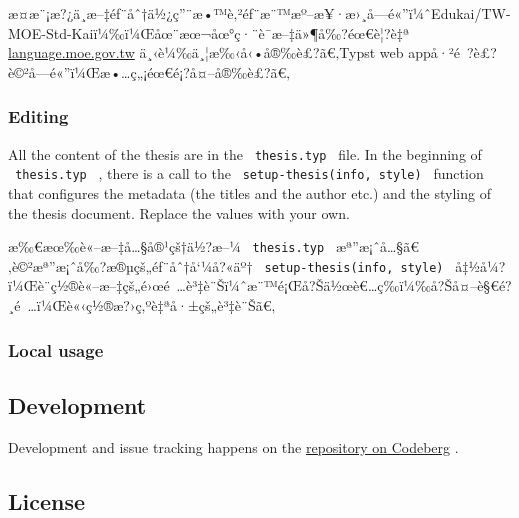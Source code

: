 æ­¤æ¨¡æ?¿ä¸­æ--‡éƒ¨åˆ†ä½¿ç''¨æ•™è‚²éƒ¨æ¨™æº--æ¥·æ›¸å­---é«''ï¼ˆEdukai/TW-MOE-Std-Kaiï¼‰ï¼Œåœ¨æœ¬åœ°ç·¨è­¯æ--‡ä»¶å‰?éœ€è¦?è‡ª
\href{https://language.moe.gov.tw/001/Upload/Files/site_content/M0001/edukai-5.0.zip}{language.moe.gov.tw}
ä¸‹è¼‰ä¸¦æ‰‹å‹•å®‰è£?ã€‚Typst web
appå·²é~?è£?è©²å­---é«''ï¼Œæ•\ldots ç„¡éœ€é¡?å¤--å®‰è£?ã€‚

\subsubsection{Editing}\label{editing}

All the content of the thesis are in the \texttt{\ thesis.typ\ } file.
In the beginning of \texttt{\ thesis.typ\ } , there is a call to the
\texttt{\ setup-thesis(info,\ style)\ } function that configures the
metadata (the titles and the author etc.) and the styling of the thesis
document. Replace the values with your own.

æ‰€æœ‰è«--æ--‡å\ldots§å®¹çš†ä½?æ--¼ \texttt{\ thesis.typ\ }
æª''æ¡ˆå\ldots§ã€‚è©²æª''æ¡ˆå‰?æ®µçš„éƒ¨åˆ†å`¼å?«äº†
\texttt{\ setup-thesis(info,\ style)\ }
å‡½å¼?ï¼Œè¨­ç½®è«--æ--‡çš„é›œé~\ldots è³‡è¨Šï¼ˆæ¨™é¡Œå?Šä½œè€\ldots ç­‰ï¼‰å?Šå¤--è§€é?¸é~\ldots ï¼Œè«‹ç½®æ?›ç‚ºè‡ªå·±çš„è³‡è¨Šã€‚

\subsubsection{Local usage}\label{local-usage}

\begin{Shaded}
\begin{Highlighting}[]
\ExtensionTok{$}
\ExtensionTok{$}
\ExtensionTok{$}
\end{Highlighting}
\end{Shaded}

\subsection{Development}\label{development}

Development and issue tracking happens on the
\href{https://codeberg.org/kotatsuyaki/canonical-nthu-thesis}{repository
on Codeberg} .

\subsection{License}\label{license}

